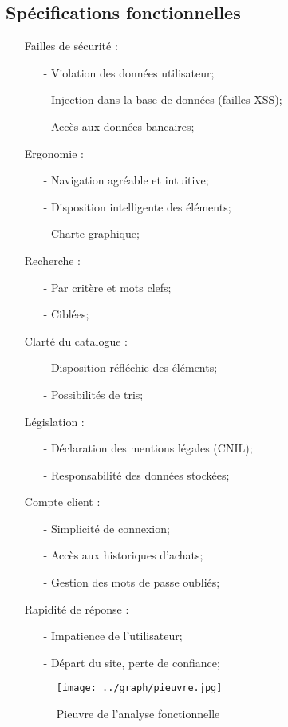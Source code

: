 \documentclass[a4paper]{article}
\begin{document}
	\subsection{Spécifications fonctionnelles}
	\begin{itemize}
		\item[]{Failles de sécurité :}
			\begin{itemize}
				\item[-] Violation des données utilisateur;
				\item[-] Injection dans la base de données (failles XSS);
				\item[-] Accès aux données bancaires;  
			\end{itemize}
		\item[]{Ergonomie :}
			\begin{itemize}
				\item[-] Navigation agréable et intuitive;
				\item[-] Disposition intelligente des éléments;
				\item[-] Charte graphique;
			\end{itemize}
		\item[]{Recherche : }
			\begin{itemize}
				\item[-] Par critère et mots clefs;
				\item[-] Ciblées;
			\end{itemize}
		\item[]{Clarté du catalogue :}
			\begin{itemize}
				\item[-] Disposition réfléchie des éléments;
				\item[-] Possibilités de tris;
			\end{itemize}
		\item[]{Législation :}
			\begin{itemize}
				\item[-] Déclaration des mentions légales (CNIL);
				\item[-] Responsabilité des données stockées;
			\end{itemize}
		\item[]{Compte client :}
			\begin{itemize}
				\item[-] Simplicité de connexion;
				\item[-] Accès aux historiques d'achats;
				\item[-] Gestion des mots de passe oubliés;
			\end{itemize}
		\item[]{Rapidité de réponse :}
			\begin{itemize}
				\item[-] Impatience de l'utilisateur;
				\item[-] Départ du site, perte de confiance; 
			\end{itemize}
	\newpage
	\begin{figure}[h]
		\centering
			\texttt{[image: ../graph/pieuvre.jpg]}
			\caption{Pieuvre de l'analyse fonctionnelle}
	\end{figure}
	\end{itemize}
\end{document}
